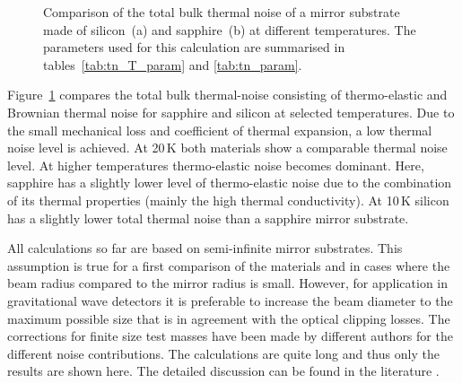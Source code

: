 \begin{figure}[!h]
\begin{center}
\end{center}
\caption{Comparison of the total bulk thermal noise of a mirror substrate made of silicon~(a) and sapphire~(b) at different temperatures. The parameters used for this calculation are summarised in tables~\ref{tab:tn_T_param} and \ref{tab:tn_param}.}
\label{fig:bulk_T_TN}
\end{figure}

Figure~\ref{fig:bulk_T_TN} compares the total bulk thermal-noise consisting of thermo-elastic and Brownian thermal noise for sapphire and silicon at selected temperatures. Due to the small mechanical loss and coefficient of thermal expansion, a low thermal noise level is achieved. At 20\,K both materials show a comparable thermal noise level. At higher temperatures thermo-elastic noise becomes dominant. Here, sapphire has a slightly lower level of thermo-elastic noise due to the combination of its thermal properties (mainly the high thermal conductivity). At 10\,K silicon has a slightly lower total thermal noise than a sapphire mirror substrate. 

All calculations so far are based on semi-infinite mirror substrates. This assumption is true for a first comparison of the materials and in cases where the beam radius compared to the mirror radius is small. However, for application in gravitational wave detectors it is preferable to increase the beam diameter to the maximum possible size that is in agreement with the optical clipping losses. The corrections for finite size test masses have been made by different authors for the different noise contributions. The calculations are quite long and thus only the results are shown here. The detailed discussion can be found in the literature \cite{Bondu1998, Liu2000}. 

